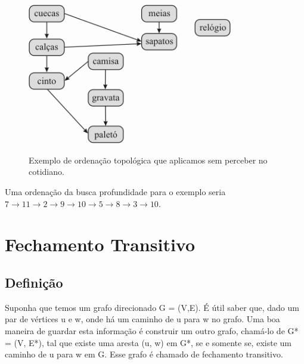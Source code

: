 \documentclass[a4paper,12pt]{article}
\begin{document}
\begin{figure}[h!]
	\caption{Exemplo de ordenação topológica que aplicamos sem perceber no cotidiano.\cite{notes-unicamp}}
	\centering
	\includegraphics[width=0.8\textwidth]{topologica}
	\label{fig:topologica_fig}
\end{figure}

Uma ordenação da busca profundidade para o exemplo seria $7 \to 11 \to 2 \to 9 \to 10 \to 5 \to 8 \to 3 \to 10$.

\clearpage
\section{Fechamento Transitivo}

\subsection{Definição}
Suponha que temos um grafo direcionado G = (V,E). É útil saber que, dado um par de vértices u e w, onde há um caminho de u para w no grafo. Uma boa maneira de guardar esta informação é construir um outro grafo, chamá-lo de G* = (V, E*), tal que existe uma aresta (u, w) em G*, se e somente se, existe um caminho de u para w em G. Esse grafo é chamado de fechamento transitivo.
\end{document}
